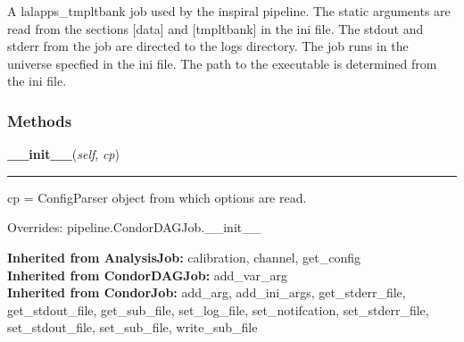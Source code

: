 A lalapps\_tmpltbank job used by the inspiral pipeline. The static 
arguments are read from the sections [data] and [tmpltbank] in the ini 
file. The stdout and stderr from the job are directed to the logs 
directory. The job runs in the universe specfied in the ini file. The 
path to the executable is determined from the ini file.



  \subsubsection{Methods}

    \label{inspiral:TmpltBankJob:__init__}
    \vspace{0.5ex}

    \noindent\begin{boxedminipage}{\textwidth}

    \raggedright \textbf{\_\_init\_\_}(\textit{self}, \textit{cp})

    \vspace{-1.5ex}

    \rule{\textwidth}{0.5\fboxrule}
    cp = ConfigParser object from which options are read.

    \vspace{1ex}

      Overrides: pipeline.CondorDAGJob.\_\_init\_\_

    \end{boxedminipage}

  \textbf{Inherited from AnalysisJob:}
    calibration,
    channel,
    get\_config
    \\
  \textbf{Inherited from CondorDAGJob:}
    add\_var\_arg
    \\
  \textbf{Inherited from CondorJob:}
    add\_arg,
    add\_ini\_args,
    get\_stderr\_file,
    get\_stdout\_file,
    get\_sub\_file,
    set\_log\_file,
    set\_notifcation,
    set\_stderr\_file,
    set\_stdout\_file,
    set\_sub\_file,
    write\_sub\_file


